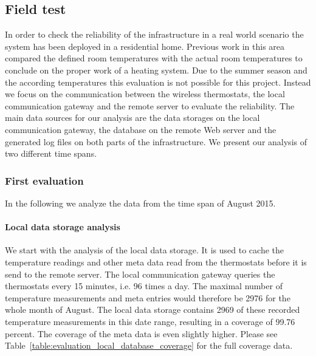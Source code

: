 \subsection{Field test}
\label{sec:evaluation_field_test}

In order to check the reliability of the infrastructure in a real world scenario the system has been deployed in a residential home.
Previous work in this area compared the defined room temperatures with the actual room temperatures to conclude on the proper work of a heating system\cite{eigenmann2012opportunisticSensing}.
Due to the summer season and the according temperatures this evaluation is not possible for this project.
Instead we focus on the communication between the wireless thermostats, the local communication gateway and the remote server to evaluate the reliability.
The main data sources for our analysis are the data storages on the local communication gateway, the database on the remote Web server and the generated log files on both parts of the infrastructure.
We present our analysis of two different time spans.

\subsubsection{First evaluation}

In the following we analyze the data from the time span of August 2015.

\paragraph{Local data storage analysis}


We start with the analysis of the local data storage.
It is used to cache the temperature readings and other meta data read from the thermostats before it is send to the remote server.
The local communication gateway queries the thermostats every 15 minutes, i.e. 96 times a day.
The maximal number of temperature measurements and meta entries would therefore be 2976 for the whole month of August.
The local data storage contains 2969 of these recorded temperature measurements in this date range, resulting in a coverage of 99.76 percent.
The coverage of the meta data is even slightly higher.
Please see Table~\ref{table:evaluation_local_database_coverage} for the full coverage data.

